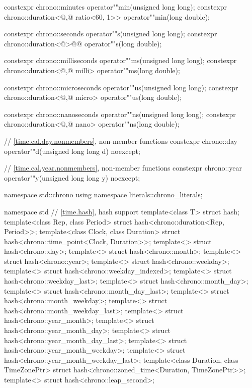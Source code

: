\begin{codeblock}
{  constexpr chrono::minutes                             operator""min(unsigned long long);
  constexpr chrono::duration<@\unspec,@ ratio<60, 1>> operator""min(long double);

  constexpr chrono::seconds               operator""s(unsigned long long);
  constexpr chrono::duration<@\unspec@>@\itcorr[-1]@ operator""s(long double);

  constexpr chrono::milliseconds                 operator""ms(unsigned long long);
  constexpr chrono::duration<@\unspec,@ milli> operator""ms(long double);

  constexpr chrono::microseconds                 operator""us(unsigned long long);
  constexpr chrono::duration<@\unspec,@ micro> operator""us(long double);

  constexpr chrono::nanoseconds                 operator""ns(unsigned long long);
  constexpr chrono::duration<@\unspec,@ nano> operator""ns(long double);

  // \ref{time.cal.day.nonmembers}, non-member functions
  constexpr chrono::day  operator""d(unsigned long long d) noexcept;

  // \ref{time.cal.year.nonmembers}, non-member functions
  constexpr chrono::year operator""y(unsigned long long y) noexcept;
}

namespace std::chrono {
  using namespace literals::chrono_literals;
}

namespace std {
  // \ref{time.hash}, hash support
  template<class T> struct hash;
  template<class Rep, class Period> struct hash<chrono::duration<Rep, Period>>;
  template<class Clock, class Duration> struct hash<chrono::time_point<Clock, Duration>>;
  template<> struct hash<chrono::day>;
  template<> struct hash<chrono::month>;
  template<> struct hash<chrono::year>;
  template<> struct hash<chrono::weekday>;
  template<> struct hash<chrono::weekday_indexed>;
  template<> struct hash<chrono::weekday_last>;
  template<> struct hash<chrono::month_day>;
  template<> struct hash<chrono::month_day_last>;
  template<> struct hash<chrono::month_weekday>;
  template<> struct hash<chrono::month_weekday_last>;
  template<> struct hash<chrono::year_month>;
  template<> struct hash<chrono::year_month_day>;
  template<> struct hash<chrono::year_month_day_last>;
  template<> struct hash<chrono::year_month_weekday>;
  template<> struct hash<chrono::year_month_weekday_last>;
  template<class Duration, class TimeZonePtr>
    struct hash<chrono::zoned_time<Duration, TimeZonePtr>>;
  template<> struct hash<chrono::leap_second>;
}
\end{codeblock}

